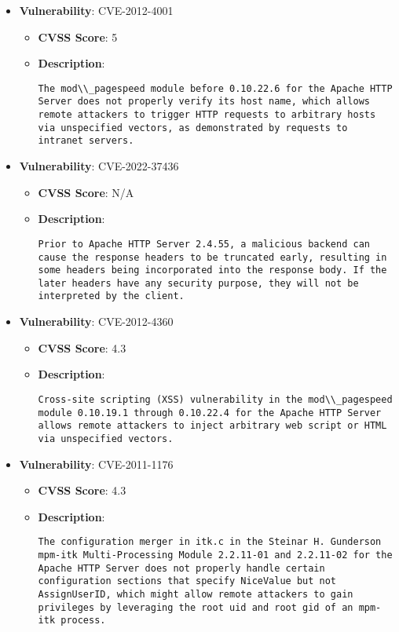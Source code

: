 \documentclass{article}
\begin{document}
\begin{itemize}
        \item \textbf{Vulnerability}: CVE-2012-4001
        \begin{itemize}
            \item \textbf{CVSS Score}:  5 
            \item \textbf{Description}:
            \parbox[t]{0.9\linewidth}{
                \verb|The mod\\_pagespeed module before 0.10.22.6 for the Apache HTTP Server does not properly verify its host name, which allows remote attackers to trigger HTTP requests to arbitrary hosts via unspecified vectors, as demonstrated by requests to intranet servers.|
            }
        \end{itemize}
    
        \item \textbf{Vulnerability}: CVE-2022-37436
        \begin{itemize}
            \item \textbf{CVSS Score}:  N/A 
            \item \textbf{Description}:
            \parbox[t]{0.9\linewidth}{
                \verb|Prior to Apache HTTP Server 2.4.55, a malicious backend can cause the response headers to be truncated early, resulting in some headers being incorporated into the response body. If the later headers have any security purpose, they will not be interpreted by the client.|
            }
        \end{itemize}
    
        \item \textbf{Vulnerability}: CVE-2012-4360
        \begin{itemize}
            \item \textbf{CVSS Score}:  4.3 
            \item \textbf{Description}:
            \parbox[t]{0.9\linewidth}{
                \verb|Cross-site scripting (XSS) vulnerability in the mod\\_pagespeed module 0.10.19.1 through 0.10.22.4 for the Apache HTTP Server allows remote attackers to inject arbitrary web script or HTML via unspecified vectors.|
            }
        \end{itemize}
    
        \item \textbf{Vulnerability}: CVE-2011-1176
        \begin{itemize}
            \item \textbf{CVSS Score}:  4.3 
            \item \textbf{Description}:
            \parbox[t]{0.9\linewidth}{
                \verb|The configuration merger in itk.c in the Steinar H. Gunderson mpm-itk Multi-Processing Module 2.2.11-01 and 2.2.11-02 for the Apache HTTP Server does not properly handle certain configuration sections that specify NiceValue but not AssignUserID, which might allow remote attackers to gain privileges by leveraging the root uid and root gid of an mpm-itk process.|
            }
        \end{itemize}
    

\end{itemize}
\end{document}
